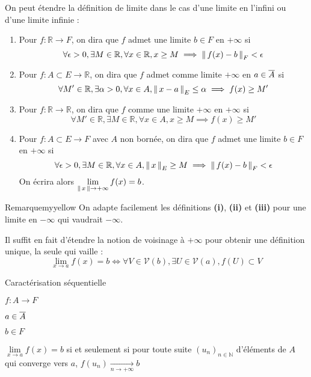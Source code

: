     On peut étendre la définition de limite dans le cas d’une limite en l’infini ou d’une limite infinie : 

    \begin{defi}{}{}
        \begin{enumerate}
            \item Pour $f : \mathbb{R} \rightarrow F$, on dira que $f$ admet une limite $b \in F$ en $+ \infty$ si 
            \[ \forall \epsilon > 0, \exists M \in \mathbb{R}, \forall x \in \mathbb{R}, x \geq M \implies \left\lVert \,f(x)-b \, \right\rVert_F < \epsilon \] 
            \item Pour $f : A \subset E \rightarrow \mathbb{R}$, on dira que $f$ admet comme limite $+ \infty$ en $a \in \overline{A}$ si 
            \[ \forall M' \in \mathbb{R}, \exists \alpha > 0, \forall x \in A, \left\lVert \,x-a \, \right\rVert_E \leq \alpha \implies f(x) \geq M' \] 
            \item Pour $f : \mathbb{R} \rightarrow \mathbb{R}$, on dira que $f$ comme une limite $+\infty$ en $+\infty$ si 
            \[ \forall M' \in \mathbb{R}, \exists M \in \mathbb{R}, \forall x \in A, x \geq M \implies f(x) \geq M' \] 
            \item Pour $f : A \subset E \rightarrow F$ avec $A$ non bornée, on dira que $f$ admet une limite $b \in F$ en $+ \infty$ si 
            \[ \forall \epsilon > 0, \exists M \in \mathbb{R}, \forall x \in A, \left\lVert \,x \, \right\rVert_E \geq M \implies \left\lVert \,f(x)-b \, \right\rVert_F < \epsilon \] 
            On écrira alors $\lim\limits_{\left\lVert \,x \, \right\rVert \rightarrow + \infty} f(x) = b$.
        \end{enumerate}
    \end{defi}

    \begin{omed}{Remarque}{myyellow}
        On adapte facilement les définitions \textbf{(i)}, \textbf{(ii)} et \textbf{(iii)} pour une limite en $-\infty$ qui vaudrait $-\infty$.

        Il suffit en fait d’étendre la notion de voisinage à $+ \infty$ pour obtenir une définition unique, la seule qui vaille :
        \[ \lim\limits_{x \rightarrow a} f(x) = b \iff \forall V \in \mathcal{V}(b), \exists U \in \mathcal{V}(a), f(U) \subset V \]
    \end{omed}

    \begin{prop}{Caractérisation séquentielle}{}
        \begin{soient}
            \item $f : A \rightarrow F$
            \item $a \in \overline{A}$
            \item $b \in F$
        \end{soient}
        $\lim\limits_{x \rightarrow a} f(x) = b$ si et seulement si pour toute suite $(u_n)_{n \in \mathbb{N}}$ d’éléments de $A$ qui converge vers $a$, $f(u_n) \underset{n \rightarrow +\infty}{\longrightarrow} b$
    \end{prop}

